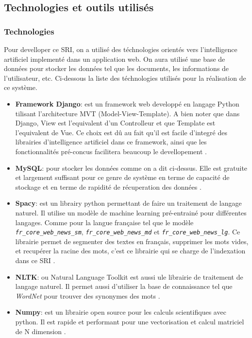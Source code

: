 \subsection{Technologies et outils utilisés}
\subsubsection{Technologies}
Pour develloper ce SRI, on a utilisé des téchnologies orientés vers l'intelligence artificiel implementé dans un application web. On aura utilisé une base de données pour stocker les données tel que les documents, les informations de l'utilisateur, etc. Ci-dessous la liste des téchnologies utilisés pour la réalisation de ce système.

\begin{itemize}
    \item \textbf{Framework Django}: est un framework web developpé en langage Python tilisant l'architecture MVT (Model-View-Template). A bien noter que dans Django, View est l'equivalent d'un Controlleur et que Template est l'equivalent de Vue. Ce choix est dû au fait qu'il est facile d'integré des librairies d'intelligence artificiel dans ce framework, ainsi que les fonctionnalités pré-concus facilitera beaucoup le devellopement \citep*{django}.
    \item \textbf{MySQL}: pour stocker les données comme on a dit ci-dessus. Elle est gratuite et largement suffisant pour ce genre de système en terme de capacité de stockage et en terme de rapidité de récuperation des données \citep*{mysql}.
    \item \textbf{Spacy}: est un librairy python permettant de faire un traitement de langage naturel. Il utilise un modèle de machine learning pré-entrainé pour différentes langages. Comme pour la langue française tel que le modèle \emph{\texttt{fr\_core\_web\_news\_sm}}, \emph{\texttt{fr\_core\_web\_news\_md}} et \emph{\texttt{fr\_core\_web\_news\_lg}}. Ce librairie permet de segmenter des textes en français, supprimer les mots vides, et recupérer la racine des mots, c'est ce librairie qui se charge de l'indexation dans ce SRI \citep*{spacy}.
    \item \textbf{NLTK}: ou Natural Language Toolkit est aussi ule librairie de traitement de langage naturel. Il permet aussi d'utiliser la base de connaissance tel que \emph{WordNet} pour trouver des synonymes des mots \citep*{nltk}.
    \item \textbf{Numpy}: est un librairie open source pour les calculs scientifiques avec python. Il est rapide et performant pour une vectorisation et calcul matriciel de N dimension \citep*{numpy}.

\end{itemize}
